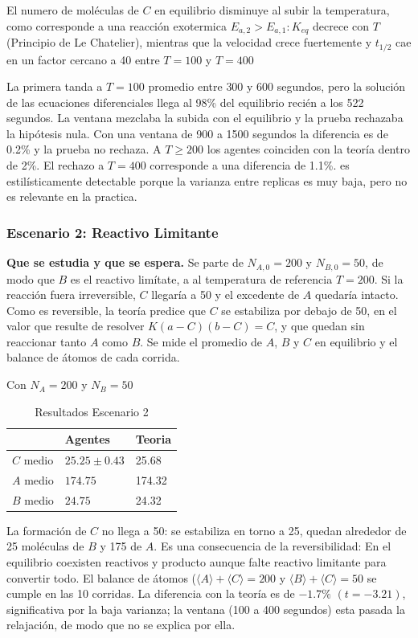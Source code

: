 \documentclass{article}
\begin{document}
El numero de moléculas de $C$ en equilibrio disminuye al subir la temperatura, como corresponde a una reacción exotermica $E_{a,2}>E_{a,1}: K_{eq}$ decrece con $T$ (Principio de Le Chatelier), mientras que la velocidad crece fuertemente y $t_{1/2}$ cae en un factor cercano a 40 entre $T=100$ y $T=400$

La primera tanda a $T=100$ promedio entre $300$ y $600$ segundos, pero la solución de las ecuaciones diferenciales llega al 98\% del equilibrio recién a los 522 segundos. La ventana mezclaba la subida con el equilibrio y la prueba rechazaba la hipótesis nula. Con una ventana de 900 a 1500 segundos la diferencia es de 0.2\% y la prueba no rechaza. A $T\geq 200$ los agentes coinciden con la teoría dentro de 2\%. El rechazo a $T=400$ corresponde a una diferencia de 1.1\%. es estilísticamente detectable porque la varianza entre replicas es muy baja, pero no es relevante en la practica.

\subsubsection{Escenario 2: Reactivo Limitante}
\textbf{Que se estudia y que se espera.} Se parte de $N_{A,0}=200$ y $N_{B,0}=50$, de modo que $B$ es el reactivo limítate, a al temperatura de referencia $T=200$. Si la reacción fuera irreversible, $C$ llegaría a 50 y el excedente de $A$ quedaría intacto. Como es reversible, la teoría predice que $C$ se estabiliza por debajo de 50, en el valor que resulte de resolver $K(a-C)(b-C)=C$, y que quedan sin reaccionar tanto $A$ como $B$. Se mide el promedio de $A$, $B$ y $C$ en equilibrio y el balance de átomos de cada corrida.

Con $N_A=200$ y $N_B=50$

\begin{table}[h]
\centering
\renewcommand{\arraystretch}{1.3} 
\caption{Resultados Escenario 2}
\begin{tabularx}{\textwidth}{ | Y | Y | Y | }
    \hline
    & \textbf{Agentes} & \textbf{Teoria} \\
    \hline
    $C$ medio & $25.25\pm 0.43$ & 25.68 \\
    \hline
    $A$ medio & $174.75$ & 174.32 \\
    \hline
    $B$ medio & $24.75$ & 24.32 \\
    \hline
\end{tabularx}
\end{table}

La formación de $C$ no llega a 50: se estabiliza en torno a 25, quedan alrededor de 25 moléculas de $B$ y 175 de $A$. Es una consecuencia de la reversibilidad: En el equilibrio coexisten reactivos y producto aunque falte reactivo limitante para convertir todo. El balance de átomos ($\langle A\rangle+\langle C\rangle=200$ y $\langle B\rangle+\langle C\rangle=50$ se cumple en las 10 corridas. La diferencia con la teoría es de $-1.7\%$ $(t=-3.21)$, significativa por la baja varianza; la ventana (100 a 400 segundos) esta pasada la relajación, de modo que no se explica por ella. 
\end{document}
